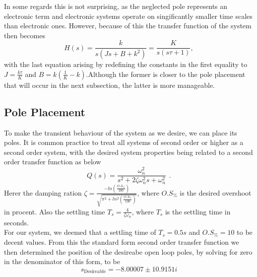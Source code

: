 \documentclass[a4paper,onecolumn,amsmath,amssymb]{revtex4-1}
\begin{document}
In some regards this is not surprising, as the neglected pole represents an electronic term and electronic systems operate on singificantly smaller time scales than electronic ones. However, because of this the transfer function of the system then becomes
\begin{equation}
H(s)=\frac{k}{s\left(Js+B+k^2\right)}=\frac{K}{s\left(s\tau+1\right)},
\end{equation}
with the last equation arising by redefining the constants in the first equality to $J=\frac{k\tau}{K}$ and $B=k(\frac{1}{K}-k)$.Although the former is closer to the pole placement that will occur in the next subsection, the latter is more manageable.\\
\subsection{\textbf{Pole Placement}}
To make the transient behaviour of the system as we desire, we can place its poles. It is common practice to treat all systems of second order or higher as a second order system, with the desired system properties being related to a second order transfer function as below\\
\begin{equation}
Q(s)=\frac{\omega_n^2 }{s^2+2\zeta \omega_n ^2 s +\omega_n ^2 }~~.
\end{equation}
Herer the damping ration $\zeta=\frac{-ln(\frac{O.S_{\%}}{100})}{\sqrt{\pi ^2 +ln^2(\frac{O.S_{\%}}{100})}}$, where $O.S_{\%}$ is the desired overshoot in procent. Also the settling time $T_s=\frac{4 }{\zeta\omega_n}$, where $T_s$ is the settling time in seconds.\\

For our system, we deemed that a settling time of $T_s=0.5s$ and $O.S_{\%}=10$ to be decent values.  From this the standard form second order transfer function we then determined the position of the desireabe open loop poles, by solving for zero in the denominator of this form, to be\\
\begin{equation}
s_{\text{Desireable}}=-8.00007\pm10.9151 i
\end{equation}
\end{document}
